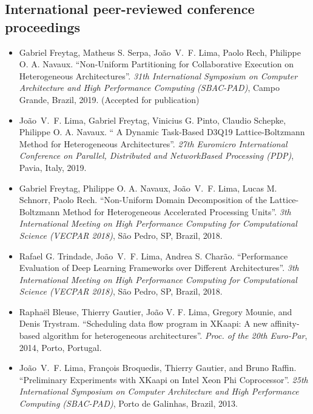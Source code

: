 \documentclass[11pt,a4paper]{article}
\begin{document}
\subsection{International peer-reviewed conference proceedings}

\begin{itemize} \itemsep -2pt

\item
Gabriel Freytag, Matheus S. Serpa, João~V.~F. Lima, Paolo Rech, Philippe O. A. Navaux.
``Non-Uniform Partitioning for Collaborative Execution on Heterogeneous Architectures''.
\emph{31th International Symposium on Computer Architecture and
High Performance Computing (SBAC-PAD)},
Campo Grande, Brazil, 2019.
(Accepted for publication)
	
\item
João~V.~F. Lima, Gabriel Freytag, Vinicius G. Pinto, Claudio Schepke, Philippe O. A. Navaux.
`` A Dynamic Task-Based D3Q19 Lattice-Boltzmann Method for Heterogeneous Architectures''.
\emph{27th Euromicro International Conference on Parallel, Distributed and NetworkBased Processing (PDP)},
Pavia, Italy, 2019.

\item
Gabriel Freytag, Philippe O. A. Navaux, João~V.~F. Lima, Lucas M. Schnorr, Paolo Rech.
``Non-Uniform Domain Decomposition of the Lattice-Boltzmann Method for Heterogeneous Accelerated Processing Units''.
\emph{3th International Meeting on High Performance Computing for Computational Science (VECPAR 2018)}, 
São Pedro, SP, Brazil, 2018.

\item
Rafael G. Trindade, João~V.~F. Lima, Andrea S. Charão.
``Performance Evaluation of Deep Learning Frameworks over Different Architectures''.
\emph{3th International Meeting on High Performance Computing for Computational Science (VECPAR 2018)}, 
São Pedro, SP, Brazil, 2018.

\item
Rapha\"el Bleuse, Thierry Gautier, João V. F. Lima, Gregory Mounie, and Denis Trystram.
``Scheduling data flow program in XKaapi: A new affinity-based algorithm for heterogeneous architectures''.
\emph{Proc. of the 20th Euro-Par}, 2014, Porto, Portugal.

\item 
João~V.~F. Lima, Fran\c{c}ois Broquedis, Thierry Gautier, and Bruno Raffin.
``Preliminary Experiments with XKaapi on Intel Xeon Phi Coprocessor''.
\emph{25th International Symposium on Computer Architecture and
  High Performance Computing (SBAC-PAD)}, Porto de Galinhas, Brazil, 2013.


\end{itemize}
\end{document}
